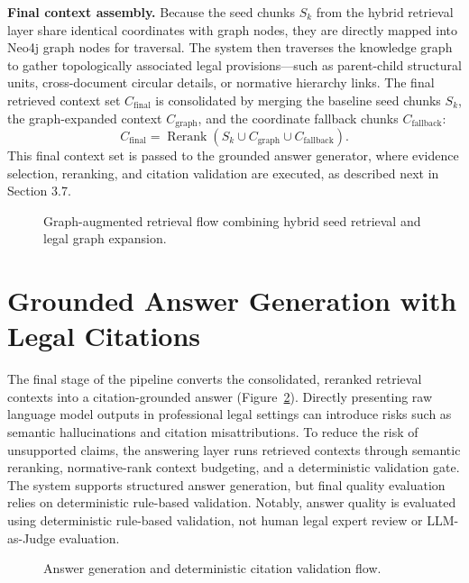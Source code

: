 \textbf{Final context assembly.} Because the seed chunks $S_k$ from the hybrid retrieval layer share identical coordinates with graph nodes, they are directly mapped into Neo4j graph nodes for traversal. The system then traverses the knowledge graph to gather topologically associated legal provisions—such as parent-child structural units, cross-document circular details, or normative hierarchy links. The final retrieved context set $C_{\mathrm{final}}$ is consolidated by merging the baseline seed chunks $S_k$, the graph-expanded context $C_{\mathrm{graph}}$, and the coordinate fallback chunks $C_{\mathrm{fallback}}$:
\[
C_{\mathrm{final}} =
\operatorname{Rerank}
\left(
S_k \cup C_{\mathrm{graph}} \cup C_{\mathrm{fallback}}
\right).
\]
This final context set is passed to the grounded answer generator, where evidence selection, reranking, and citation validation are executed, as described next in Section 3.7.

\begin{figure}[t!]
  \centering
  \resizebox{0.86\textwidth}{!}{}
  \caption{Graph-augmented retrieval flow combining hybrid seed retrieval and legal graph expansion.}
  \label{fig:graph-augmented-retrieval-flow}
\end{figure}
\FloatBarrier

\section{Grounded Answer Generation with Legal Citations}

The final stage of the pipeline converts the consolidated, reranked retrieval contexts into a citation-grounded answer (Figure~\ref{fig:answer-generation-citation-validation-flow}). Directly presenting raw language model outputs in professional legal settings can introduce risks such as semantic hallucinations and citation misattributions. To reduce the risk of unsupported claims, the answering layer runs retrieved contexts through semantic reranking, normative-rank context budgeting, and a deterministic validation gate. The system supports structured answer generation, but final quality evaluation relies on deterministic rule-based validation. Notably, answer quality is evaluated using deterministic rule-based validation, not human legal expert review or LLM-as-Judge evaluation.

\begin{figure}[t!]
  \centering
  \resizebox{0.86\textwidth}{!}{}
  \caption{Answer generation and deterministic citation validation flow.}
  \label{fig:answer-generation-citation-validation-flow}
\end{figure}
\FloatBarrier


